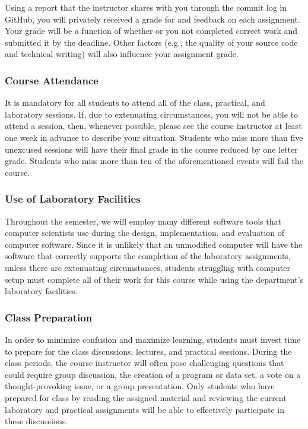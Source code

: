 \documentclass[11pt]{article}
\begin{document}
Using a report that the instructor shares with you through the commit log in GitHub, you will privately received a grade
for and feedback on each assignment. Your grade will be a function of whether or you not completed correct work and
submitted it by the deadline. Other factors (e.g., the quality of your source code and technical writing) will also
influence your assignment grade.

\subsubsection*{Course Attendance}

It is mandatory for all students to attend all of the class, practical, and laboratory sessions. If, due to extenuating
circumstances, you will not be able to attend a session, then, whenever possible, please see the course instructor at
least one week in advance to describe your situation. Students who miss more than five unexcused sessions will have
their final grade in the course reduced by one letter grade. Students who miss more than ten of the aforementioned
events will fail the course.

\subsubsection*{Use of Laboratory Facilities}

Throughout the semester, we will employ many different software tools that computer scientists use during the design,
implementation, and evaluation of computer software. Since it is unlikely that an unmodified computer will have the
software that correctly supports the completion of the laboratory assignments, unless there are extenuating
circumstances, students struggling with computer setup must complete all of their work for this course while using the
department's laboratory facilities.

\subsubsection*{Class Preparation}

In order to minimize confusion and maximize learning, students must invest time to prepare for the class discussions,
lectures, and practical sessions. During the class periods, the course instructor will often pose challenging questions
that could require group discussion, the creation of a program or data set, a vote on a thought-provoking issue, or a
group presentation. Only students who have prepared for class by reading the assigned material and reviewing the
current laboratory and practical assignments will be able to effectively participate in these discussions.
\end{document}
